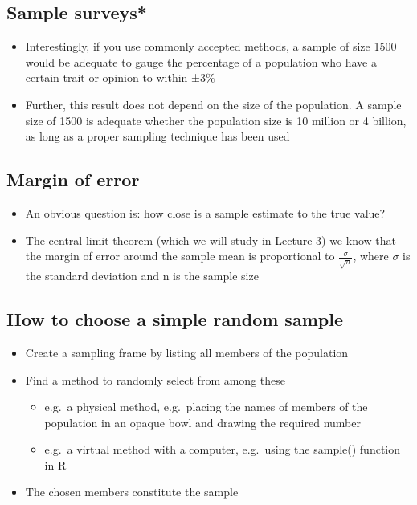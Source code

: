 \documentclass[
]{book}
\providecommand{\tightlist}{%
  \setlength{\itemsep}{0pt}\setlength{\parskip}{0pt}}
\begin{document}
\hypertarget{sample-surveys-1}{%
\subsection{Sample surveys*}\label{sample-surveys-1}}

\begin{itemize}
\tightlist
\item
  Interestingly, if you use commonly accepted methods, a sample of size 1500 would be adequate to gauge the percentage of a population who have a certain trait or opinion to within ±3\%
\item
  Further, this result does not depend on the size of the population. A sample size of 1500 is adequate whether the population size is 10 million or 4 billion, as long as a proper sampling technique has been used
\end{itemize}

\hypertarget{margin-of-error}{%
\subsection{Margin of error}\label{margin-of-error}}

\begin{itemize}
\tightlist
\item
  An obvious question is: how close is a sample estimate to the true value?
\item
  The central limit theorem (which we will study in Lecture 3) we know that the margin of error around the sample mean is proportional to \(\frac{\sigma}{\sqrt n}\), where \(\sigma\) is the standard deviation and n is the sample size
\end{itemize}

\hypertarget{how-to-choose-a-simple-random-sample}{%
\subsection{How to choose a simple random sample}\label{how-to-choose-a-simple-random-sample}}

\begin{itemize}
\tightlist
\item
  Create a sampling frame by listing all members of the population
\item
  Find a method to randomly select from among these

  \begin{itemize}
  \tightlist
  \item
    e.g.~a physical method, e.g.~placing the names of members of the population in an opaque bowl and drawing the required number
  \item
    e.g.~a virtual method with a computer, e.g.~using the sample() function in R
  \end{itemize}
\item
  The chosen members constitute the sample
\end{itemize}
\end{document}
